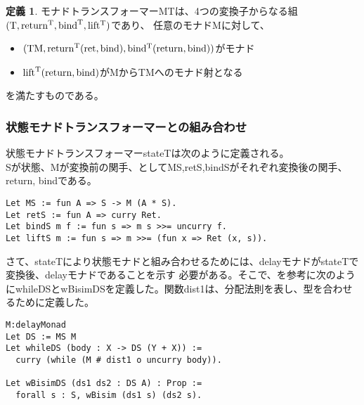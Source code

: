 \documentclass[japanese]{jssst_ppl}
\theoremstyle{definition}
\newtheorem{definition}[theorem]{定義}
\newcommand{\bind}{\rm{bind}}
\newcommand{\ret}{\rm{return}}
\begin{document}
  \begin{definition}
    モナドトランスフォーマーMTは、4つの変換子からなる組$(\text{T},\ret^T,\bind^T,lift^T)$であり、
    任意のモナドMに対して、
    \begin{itemize}
      \item $(\text{TM}, \ret^T(ret, \bind), bind^T(\ret,\bind))$がモナド
      \item $\text{lift}^\text{T}(\ret,\bind)$がMからTMへのモナド射となる
    \end{itemize}
    を満たすものである。
  \end{definition}

\fi
\subsubsection{状態モナドトランスフォーマーとの組み合わせ}
状態モナドトランスフォーマーstateTは次のように定義される。\\
Sが状態、Mが変換前の関手、としてMS,retS,bindSがそれぞれ変換後の関手、return, bindである。

\begin{verbatim}
Let MS := fun A => S -> M (A * S).
Let retS := fun A => curry Ret.
Let bindS m f := fun s => m s >>= uncurry f.
Let liftS m := fun s => m >>= (fun x => Ret (x, s)).
        \end{verbatim}

さて、stateTにより状態モナドと組み合わせるためには、delayモナドがstateTで変換後、delayモナドであることを示す
必要がある。そこで、\cite{d}を参考に次のようにwhileDSとwBisimDSを定義した。関数dist1は、分配法則を表し、型を合わせるために定義した。
\iffalse
  そこで、次の定理を用いた。\\

  随伴にcurryとuncurryを

  特に状態モナドが随伴$(- \otimes A) \vdash (A \rightarrow - )$から導出されるため次のように
  while operatorとwBisimを定義した。関数dist1は、分配法則を表し、型を合わせるために定義した。
\fi

\begin{verbatim}
M:delayMonad
Let DS := MS M
Let whileDS (body : X -> DS (Y + X)) :=
  curry (while (M # dist1 o uncurry body)).

Let wBisimDS (ds1 ds2 : DS A) : Prop :=
  forall s : S, wBisim (ds1 s) (ds2 s).
          \end{verbatim}
\end{document}
